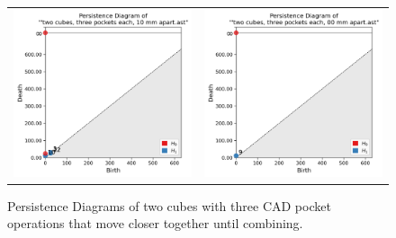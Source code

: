 \documentclass[ma]{uncgdissertationexp}
\theoremstyle{plain}
\theoremstyle{definition}
\theoremstyle{remark}
\begin{document}
\begin{figure}[H]
\begin{center}
\begin{tabular}{cc}
         \includegraphics[width=2.5in]{Final Run, (two cubes, three pockets each, 10 mm apart) persdia.png} & 
         \includegraphics[width=2.5in]{Final Run, (two cubes, three pockets each, 00 mm apart) persdia.png} \\
\end{tabular}
\end{center}
    \caption{Persistence Diagrams of two cubes with three CAD pocket operations that move closer together until combining.}
    \label{fig:cube_two_cubes_persdia_table}
\end{figure}

\newpage
\end{document}
